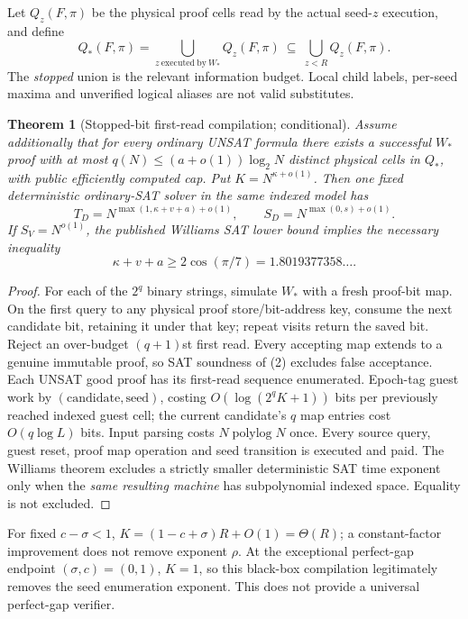 \documentclass[11pt]{article}
\newtheorem{theorem}{Theorem}
\begin{document}
Let $Q_z(F,\pi)$ be the physical proof cells read by the actual seed-$z$ execution, and define
\[
Q_*(F,\pi)=\bigcup_{z\ \mathrm{executed\ by}\ W_*} Q_z(F,\pi)
\ \subseteq\ \bigcup_{z<R}Q_z(F,\pi). \tag{3}
\]
The \emph{stopped} union is the relevant information budget. Local child labels, per-seed maxima and unverified logical aliases are not valid substitutes.

\begin{theorem}[Stopped-bit first-read compilation; conditional]
Assume additionally that for every ordinary UNSAT formula there exists a successful $W_*$ proof with at most $q(N)\le(a+o(1))\log_2N$ \emph{distinct physical cells} in $Q_*$, with public efficiently computed cap. Put $K=N^{\kappa+o(1)}$. Then one fixed deterministic ordinary-SAT solver in the \emph{same indexed} model has
\[
T_D=N^{\max(1,\kappa+v+a)+o(1)},\qquad
S_D=N^{\max(0,s)+o(1)}.\tag{4}
\]
If $S_V=N^{o(1)}$, the published Williams SAT lower bound implies the necessary inequality
\[
\boxed{\kappa+v+a\ge 2\cos(\pi/7)=1.8019377358\ldots .}\tag{5}
\]
\end{theorem}
\begin{proof}
For each of the $2^q$ binary strings, simulate $W_*$ with a fresh proof-bit map. On the first query to any physical proof store/bit-address key, consume the next candidate bit, retaining it under that key; repeat visits return the saved bit. Reject an over-budget $(q+1)$st first read. Every accepting map extends to a genuine immutable proof, so SAT soundness of (2) excludes false acceptance. Each UNSAT good proof has its first-read sequence enumerated. Epoch-tag guest work by $(\mathrm{candidate},\mathrm{seed})$, costing $O(\log(2^q K+1))$ bits per previously reached indexed guest cell; the current candidate's $q$ map entries cost $O(q\log L)$ bits. Input parsing costs $N\operatorname{polylog}N$ once. Every source query, guest reset, proof map operation and seed transition is executed and paid. The Williams theorem excludes a strictly smaller deterministic SAT time exponent only when the \emph{same resulting machine} has subpolynomial indexed space. Equality is not excluded.
\end{proof}

For fixed $c-\sigma<1$, $K=(1-c+\sigma)R+O(1)=\Theta(R)$; a constant-factor improvement does not remove exponent $\rho$. At the exceptional perfect-gap endpoint $(\sigma,c)=(0,1)$, $K=1$, so this black-box compilation legitimately removes the seed enumeration exponent. This does not provide a universal perfect-gap verifier.
\end{document}
